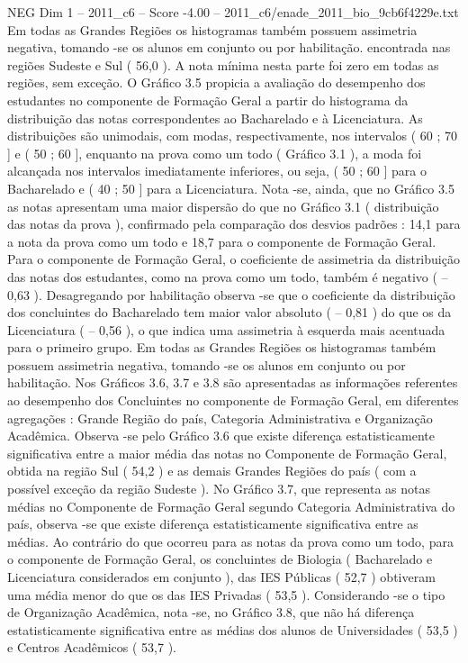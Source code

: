 \begin{textsample}{NEG Dim 1 – 2011\_c6 – Score -4.00 – 2011\_c6/enade\_2011\_bio\_9cb6f4229e.txt}
Em todas as Grandes Regiões os histogramas também possuem assimetria negativa, tomando -se os alunos em conjunto ou por habilitação. encontrada nas regiões Sudeste e Sul ( 56,0 ).
A nota mínima nesta parte foi zero em todas as regiões, sem exceção.
O Gráfico 3.5 propicia a avaliação do desempenho dos estudantes no componente de Formação Geral a partir do histograma da distribuição das notas correspondentes ao Bacharelado e à Licenciatura.
As distribuições são unimodais, com modas, respectivamente, nos intervalos ( 60 ; 70 ] e ( 50 ; 60 ], enquanto na prova como um todo ( Gráfico 3.1 ), a moda foi alcançada nos intervalos imediatamente inferiores, ou seja, ( 50 ; 60 ] para o Bacharelado e ( 40 ; 50 ] para a Licenciatura.
Nota -se, ainda, que no Gráfico 3.5 as notas apresentam uma maior dispersão do que no Gráfico 3.1 ( distribuição das notas da prova ), confirmado pela comparação dos desvios padrões : 14,1 para a nota da prova como um todo e 18,7 para o componente de Formação Geral.
Para o componente de Formação Geral, o coeficiente de assimetria da distribuição das notas dos estudantes, como na prova como um todo, também é negativo ( – 0,63 ).
Desagregando por habilitação observa -se que o coeficiente da distribuição dos concluintes do Bacharelado tem maior valor absoluto ( – 0,81 ) do que os da Licenciatura ( – 0,56 ), o que indica uma assimetria à esquerda mais acentuada para o primeiro grupo.
Em todas as Grandes Regiões os histogramas também possuem assimetria negativa, tomando -se os alunos em conjunto ou por habilitação.
Nos Gráficos 3.6, 3.7 e 3.8 são apresentadas as informações referentes ao desempenho dos Concluintes no componente de Formação Geral, em diferentes agregações : Grande Região do país, Categoria Administrativa e Organização Acadêmica.
Observa -se pelo Gráfico 3.6 que existe diferença estatisticamente significativa entre a maior média das notas no Componente de Formação Geral, obtida na região Sul ( 54,2 ) e as demais Grandes Regiões do país ( com a possível exceção da região Sudeste ).
No Gráfico 3.7, que representa as notas médias no Componente de Formação Geral segundo Categoria Administrativa do país, observa -se que existe diferença estatisticamente significativa entre as médias.
Ao contrário do que ocorreu para as notas da prova como um todo, para o componente de Formação Geral, os concluintes de Biologia ( Bacharelado e Licenciatura considerados em conjunto ), das IES Públicas ( 52,7 ) obtiveram uma média menor do que os das IES Privadas ( 53,5 ).
Considerando -se o tipo de Organização Acadêmica, nota -se, no Gráfico 3.8, que não há diferença estatisticamente significativa entre as médias dos alunos de Universidades ( 53,5 ) e Centros Acadêmicos ( 53,7 ).

\end{textsample}
